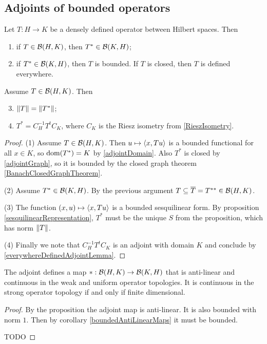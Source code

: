 \subsection{Adjoints of bounded operators}
\begin{proposition}
Let $T: H\to K$ be a densely defined operator between Hilbert spaces. Then
\begin{enumerate}
\item if $T\in\operatorname{\mathcal{B}}(H,K)$, then $T^*\in\operatorname{\mathcal{B}}(K,H)$;
\item if $T^*\in\operatorname{\mathcal{B}}(K,H)$, then $T$ is bounded. If $T$ is closed, then $T$ is defined everywhere.
\end{enumerate}
Assume $T\in\operatorname{\mathcal{B}}(H,K)$. Then
\begin{enumerate} \setcounter{enumi}{2}
\item $\lVert T\rVert = \lVert T^*\rVert$;
\item $T^* = C_H^{-1}T^tC_K$, where $C_K$ is the Riesz isometry from \ref{RieszIsometry}.
\end{enumerate}
\end{proposition}
\begin{proof}
(1) Assume $T\in\operatorname{\mathcal{B}}(H,K)$. Then $u\mapsto \inner{x,Tu}$ is a bounded functional for all $x\in K$, so $\operatorname{dom}(T^*) = K$ by \ref{adjointDomain}. Also $T^*$ is closed by \ref{adjointGraph}, so it is bounded by the closed graph theorem \ref{BanachClosedGraphTheorem}.

(2) Assume $T^*\in\operatorname{\mathcal{B}}(K,H)$. By the previous argument $T \subseteq \overline{T} = T^{**}\in\operatorname{\mathcal{B}}(H,K)$.

(3) The function $(x,u)\mapsto \inner{x,Tu}$ is a bounded sesquilinear form. By proposition \ref{sesquilinearRepresentation}, $T^*$ must be the unique $S$ from the proposition, which has norm $\lVert T\rVert$.

(4) Finally we note that $C_H^{-1}T^tC_K$ is an adjoint with domain $K$ and conclude by \ref{everywhereDefinedAdjointLemma}.
\end{proof}

\begin{lemma}
The adjoint defines a map $*:\operatorname{\mathcal{B}}(H,K)\to \operatorname{\mathcal{B}}(K,H)$ that is anti-linear and continuous in the weak and uniform operator topologies. It is continuous in the strong operator topology \textup{if and only if} finite dimensional.
\end{lemma}
\begin{proof}
By the proposition the adjoint map is anti-linear. It is also bounded with norm $1$. Then by corollary \ref{boundedAntiLinearMaps} it must be bounded.

TODO
\end{proof}

